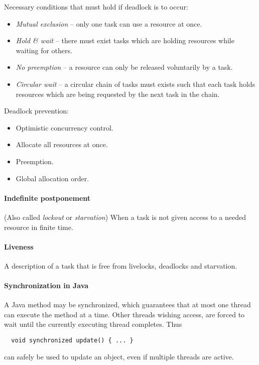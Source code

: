 Necessary conditions that must hold if deadlock is to occur:
%
\begin{itemize}[nolistsep,noitemsep]
  \item \textit{Mutual exclusion} -- only one task can use a resource at once.
  \item \textit{Hold \& wait} -- there must exist tasks which are holding resources while waiting for others.
  \item \textit{No preemption} -- a resource can only be released voluntarily by a task.
  \item \textit{Circular wait} -- a circular chain of tasks must exists such that each task holds resources which are being requested by the next task in the chain.
\end{itemize}

\noindent Deadlock prevention:
%
\begin{itemize}[nolistsep,noitemsep]
  \item Optimistic concurrency control.
  \item Allocate all resources at once.
  \item Preemption.
  \item Global allocation order.
\end{itemize}

\paragraph{Indefinite postponement} (Also called \textit{lockout} or \textit{starvation}) When a task is not given access to a needed resource in finite time.

\paragraph{Liveness} A description of a task that is free from livelocks, deadlocks and starvation.



\paragraph{Synchronization in Java} A Java method may be synchronized, which guarantees that at most one thread can execute the method at a time. Other threads wishing access, are forced to wait until the currently executing thread completes. Thus
%
\begin{lstlisting}
  void synchronized update() { ... }
\end{lstlisting}
%
can safely be used to update an object, even if multiple threads are active.

